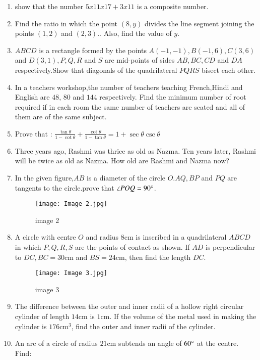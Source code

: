 \documentclass[12pt,-letter paper]{article}
\providecommand{\brak}[1]{\ensuremath{\left(#1\right)}}
\begin{document}
\begin{enumerate}
\item show that the number $5x11x17+3x11$ is a composite number.
\item Find the ratio in which the point $\brak{8, y}$ divides the line segment joining the points $\brak{1, 2}$ and $\brak{2, 3}$.. Also, find the value of  $y$.
\newpage
\item $ABCD$ is a rectangle formed by the points $ A\brak{-1,-1}, B\brak{-1, 6}, C\brak{3, 6}$ and $D\brak{3, 1}, P, Q, R$ and $S$ are mid-points of sides $AB, BC, CD$ and $DA$ respectively.Show that diagonals of the quadrilateral $PQRS$ bisect each other.
\item In a teachers workshop,the number of teachers teaching French,Hindi and English are $48$, $80$ and $144$ respectively. Find the minimum number of root required if in each room the same number of teachers are seated and all of them are of the same subject.
\item Prove that : $\frac{\tan{\theta}}{1 - \cot{\theta}} + \frac{\cot{\theta}}{1 - \tan{\theta}} = 1 + \sec{\theta}\csc{\theta}$
\item Three years ago, Rashmi was thrice as old as Nazma. Ten years later, Rashmi will be twice as old as Nazma. How old are Rashmi and Nazma now?
\item In the given figure,$AB$ is a diameter of the circle $O. AQ, BP$ and $PQ$ are tangents to the circle.prove that $\angle POQ = 90\degree$.
\begin{figure}[!ht]
\centering
\texttt{[image: Image 2.jpg]}
\label{fig:Image 2}
\caption{image 2}
\end{figure}
\item  A circle with centre $O$ and radius $8\mathrm{cm}$ is inscribed in a quadrilateral $ABCD$ in which $P, Q, R, S$ are the points of contact as shown. If $AD$ is perpendicular to $DC, BC = 30\mathrm{cm}$ and $BS = 24\mathrm{cm}$, then find the length $DC$.
\begin{figure}[!ht]
\centering
\texttt{[image: Image 3.jpg]}
\label{fig:Image 3}
\caption{image 3}
\end{figure}
\item The difference between the outer and inner radii of a hollow right circular cylinder of length $14\mathrm{cm}$ is $1\mathrm{cm}$. If the volume of the metal used in making the cylinder is $176\mathrm{cm}^3$, find the outer and inner radii of the cylinder.
\newline
\item An arc of a circle of radius $21\mathrm{cm}$ subtends an angle of $60\degree$ at the centre. Find:

\end{enumerate}
\end{document}
